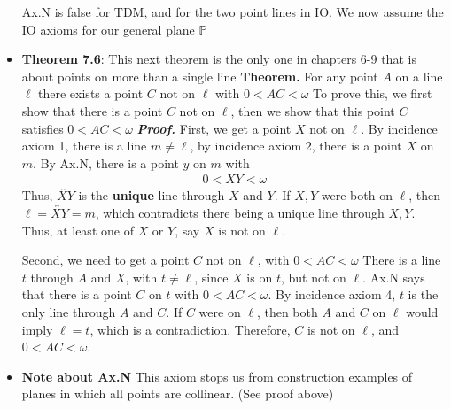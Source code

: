 \documentclass{report}
\begin{document}
\begin{itemize}
            \bigbreak \noindent 
            Ax.N is false for TDM, and for the two point lines in IO.
            \bigbreak \noindent 
            We now assume the IO axioms for our general plane $\mathbb{P}$
        \item \textbf{Theorem 7.6}: This next theorem is the only one in chapters 6-9 that is about points on more than a single line
            \bigbreak \noindent 
            \textbf{Theorem.} For any point $A$ on a line $\ell$ there exists a point $C$ not on $\ell$ with $0 < AC <\omega$ 
            \bigbreak \noindent 
            To prove this, we first show that there is a point $C$ not on $\ell$, then we show that this point $C$ satisfies $0 < AC < \omega$
            \bigbreak \noindent 
            \textbf{\textit{Proof.}}
            \bigbreak \noindent 
            First, we get a point $X$ not on $\ell$. By incidence axiom 1, there is a line $m \ne \ell$, by incidence axiom 2, there is a point $X$ on $m$. By Ax.N, there is a point $y$ on $m$ with 
            \begin{align*}
                0 < XY < \omega
            \end{align*}
            Thus, $\overleftrightarrow{XY} $ is the \textbf{unique} line through $X$ and $Y$. If $X,Y$ were both on $\ell$, then $\ell = \overleftrightarrow{XY} = m$, which contradicts there being a unique line through $X,Y$. Thus, at least one of $X$ or $Y$, say $X$ is not on $\ell$.
            \bigbreak \noindent 
            \begin{figure}[ht]
                \centering
                \label{fig:fig123}
            \end{figure}
            \bigbreak \noindent 
            Second, we need to get a point $C$ not on $\ell$, with $0 < AC < \omega$
            \bigbreak \noindent 
            There is a line $t$ through $A$ and $X$, with $t\ne \ell$, since $X$ is on $t$, but not on $\ell$. Ax.N says that there is a point $C$ on $t$ with $0 < AC < \omega$. By incidence axiom 4, $t$ is the only line through $A$ and $C$. If $C$ were on $\ell$, then both $A$ and $C$ on $\ell$ would imply $\ell = t$, which is a contradiction.
            \bigbreak \noindent 
            Therefore, $C$ is not on $\ell$, and $0 < AC < \omega$.
            \bigbreak \noindent 
\begin{figure}[ht]
    \centering
    \label{fig:fig12}
\end{figure}
        \item \textbf{Note about Ax.N} This axiom stops us from construction examples of planes in which all points are collinear. (See proof above)

\end{itemize}
\end{document}
